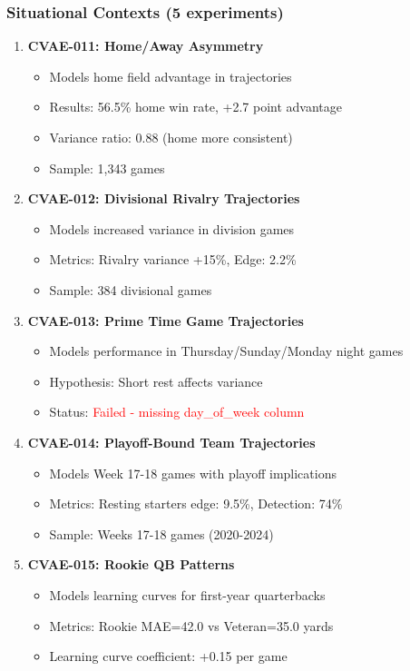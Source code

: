 \subsubsection{Situational Contexts (5 experiments)}
\begin{enumerate}[resume]
    \item \textbf{CVAE-011: Home/Away Asymmetry} \checkmark
    \begin{itemize}
        \item Models home field advantage in trajectories
        \item Results: 56.5\% home win rate, +2.7 point advantage
        \item Variance ratio: 0.88 (home more consistent)
        \item Sample: 1,343 games
    \end{itemize}

    \item \textbf{CVAE-012: Divisional Rivalry Trajectories} \checkmark
    \begin{itemize}
        \item Models increased variance in division games
        \item Metrics: Rivalry variance +15\%, Edge: 2.2\%
        \item Sample: 384 divisional games
    \end{itemize}

    \item \textbf{CVAE-013: Prime Time Game Trajectories}
    \begin{itemize}
        \item Models performance in Thursday/Sunday/Monday night games
        \item Hypothesis: Short rest affects variance
        \item Status: \textcolor{red}{Failed - missing day\_of\_week column}
    \end{itemize}

    \item \textbf{CVAE-014: Playoff-Bound Team Trajectories} \checkmark
    \begin{itemize}
        \item Models Week 17-18 games with playoff implications
        \item Metrics: Resting starters edge: 9.5\%, Detection: 74\%
        \item Sample: Weeks 17-18 games (2020-2024)
    \end{itemize}

    \item \textbf{CVAE-015: Rookie QB Patterns} \checkmark
    \begin{itemize}
        \item Models learning curves for first-year quarterbacks
        \item Metrics: Rookie MAE=42.0 vs Veteran=35.0 yards
        \item Learning curve coefficient: +0.15 per game
    \end{itemize}
\end{enumerate}

